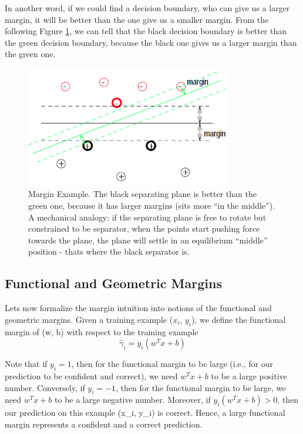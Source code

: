 \documentclass[a4paper]{article}
\begin{document}
In another word, if we could find a decision boundary, who can give us a larger margin, it will be better than the one give us a smaller margin. From the following Figure \ref{fig:margin}, we can tell that the black decision boundary is better than the green decision boundary, because the black one gives us a larger margin than the green one.
\begin{figure}[h!]
  \centering
    \includegraphics[width=0.8\textwidth]{./images/margin}
  \caption{Margin Example. The black separating plane is better than the green one, because it has larger margins (sits more ``in the middle''). A mechanical analogy: if the separating plane is free to rotate but constrained to be separator, when the points start pushing force towards the plane, the plane will settle in an equilibrium ``middle'' position - thats where the black separator is. }\label{fig:margin}
\end{figure}


\subsection{Functional and Geometric Margins}
Lets now formalize the margin intuition into  notions of the functional and geometric margins. Given a training example ($x_i$, $y_i$), we define the functional margin of (w, b) with respect to the training example
$$
	\hat{\gamma}_i = y_i (w^T x + b)
$$

Note that if $y_i = 1$, then for the functional margin to be large (i.e., for our prediction to be confident and correct), we need $w^T x + b$ to be a large positive number. Conversely, if $y_i = -1$, then for the functional margin to be large, we need $w^T x + b$ to be a large negative number. Moreover, if $y_i (w^T x + b) > 0$, then our prediction on this example (x\_i, y\_i) is correct. Hence, a large functional margin represents a confident and a correct prediction. 
\end{document}
